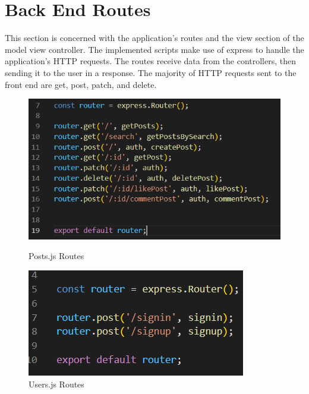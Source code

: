 \section{Back End Routes}
This section is concerned with the application's routes and the view section of the model view controller. The implemented scripts make use of express to handle the application's HTTP requests. The routes receive data from the controllers, then sending it to the user in a response. The majority of HTTP requests sent to the front end are get, post, patch, and delete.
\begin{figure}[ht]
\begin{minipage}[b]{0.4\linewidth}
    \centering
    \includegraphics[width=\linewidth]{images/routePosts}
    \caption{Posts.js Routes}
\end{minipage}
    \hspace{0.5cm}
    \begin{minipage}[b]{0.5\linewidth}
    \centering
   \includegraphics[width=\linewidth]{images/routeUsers}
    \caption{Users.js Routes}
\end{minipage}
\end{figure}


